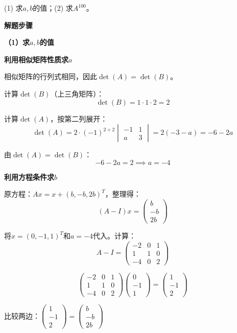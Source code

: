 \documentclass[standard]{ExBook}
\begin{document}
\begin{qitems}
\begin{bbox}
        (1) 求$a, b$的值；(2) 求$A^{100}$。
        \begin{solution}
            \textbf{解题步骤}
            
            \textbf{（1）求$a, b$的值}
            
            \textbf{利用相似矩阵性质求$a$}
            
            相似矩阵的行列式相同，因此$\det(A) = \det(B)$。
            
            计算$\det(B)$（上三角矩阵）：
            $$\det(B) = 1 \cdot 1 \cdot 2 = 2$$
            
            计算$\det(A)$，按第二列展开：
            $$\det(A) = 2 \cdot (-1)^{2+2} \begin{vmatrix} -1 & 1 \\ a & 3 \end{vmatrix} = 2(-3 - a) = -6 - 2a$$
            
            由$\det(A) = \det(B)$：
            $$-6 - 2a = 2 \implies a = -4$$
            
            \textbf{利用方程条件求$b$}
            
            原方程：$Ax = x + (b, -b, 2b)^T$，整理得：
            $$(A - I)x = \begin{pmatrix} b \\ -b \\ 2b \end{pmatrix}$$
            
            将$x = (0, -1, 1)^T$和$a = -4$代入。计算：
            $$A - I = \begin{pmatrix} -2 & 0 & 1 \\ 1 & 1 & 0 \\ -4 & 0 & 2 \end{pmatrix}$$
            
            $$\begin{pmatrix} -2 & 0 & 1 \\ 1 & 1 & 0 \\ -4 & 0 & 2 \end{pmatrix} \begin{pmatrix} 0 \\ -1 \\ 1 \end{pmatrix} = \begin{pmatrix} 1 \\ -1 \\ 2 \end{pmatrix}$$
            
            比较两边：$\begin{pmatrix} 1 \\ -1 \\ 2 \end{pmatrix} = \begin{pmatrix} b \\ -b \\ 2b \end{pmatrix}$
            

\end{solution}
\end{bbox}
\end{qitems}
\end{document}
